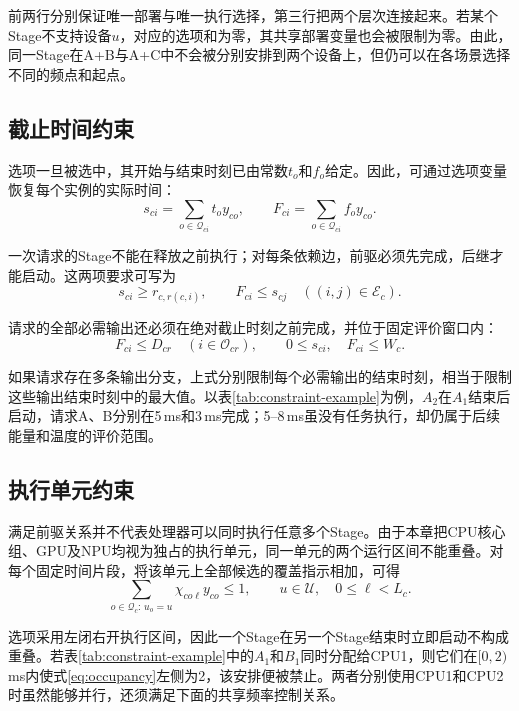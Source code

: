 前两行分别保证唯一部署与唯一执行选择，第三行把两个层次连接起来。若某个Stage不支持设备$u$，对应的选项和为零，其共享部署变量也会被限制为零。由此，同一Stage在A+B与A+C中不会被分别安排到两个设备上，但仍可以在各场景选择不同的频点和起点。

\subsection{截止时间约束}

选项一旦被选中，其开始与结束时刻已由常数$t_o$和$f_o$给定。因此，可通过选项变量恢复每个实例的实际时间：
\begin{equation}
s_{ci}=\sum_{o\in\mathcal Q_{ci}}t_oy_{co},\qquad
F_{ci}=\sum_{o\in\mathcal Q_{ci}}f_oy_{co}.
\label{eq:option-times}
\end{equation}

一次请求的Stage不能在释放之前执行；对每条依赖边，前驱必须先完成，后继才能启动。这两项要求可写为
\begin{equation}
s_{ci}\ge r_{c,r(c,i)},\qquad
F_{ci}\le s_{cj}\quad ((i,j)\in\mathcal E_c).
\label{eq:precedence}
\end{equation}

请求的全部必需输出还必须在绝对截止时刻之前完成，并位于固定评价窗口内：
\begin{equation}
F_{ci}\le D_{cr}\quad(i\in\mathcal O_{cr}),\qquad
0\le s_{ci},\quad F_{ci}\le W_c.
\label{eq:deadlines}
\end{equation}

如果请求存在多条输出分支，上式分别限制每个必需输出的结束时刻，相当于限制这些输出结束时刻中的最大值。以表\ref{tab:constraint-example}为例，$A_2$在$A_1$结束后启动，请求A、B分别在5\,ms和3\,ms完成；5--8\,ms虽没有任务执行，却仍属于后续能量和温度的评价范围。

\subsection{执行单元约束}

满足前驱关系并不代表处理器可以同时执行任意多个Stage。由于本章把CPU核心组、GPU及NPU均视为独占的执行单元，同一单元的两个运行区间不能重叠。对每个固定时间片段，将该单元上全部候选的覆盖指示相加，可得
\begin{equation}
\sum_{o\in\mathcal Q_c:\,u_o=u}\chi_{co\ell}y_{co}\le1,
\qquad u\in\mathcal U,\quad 0\le\ell<L_c.
\label{eq:occupancy}
\end{equation}

选项采用左闭右开执行区间，因此一个Stage在另一个Stage结束时立即启动不构成重叠。若表\ref{tab:constraint-example}中的$A_1$和$B_1$同时分配给CPU1，则它们在$[0,2)$\,ms内使式\eqref{eq:occupancy}左侧为2，该安排便被禁止。两者分别使用CPU1和CPU2时虽然能够并行，还须满足下面的共享频率控制关系。

